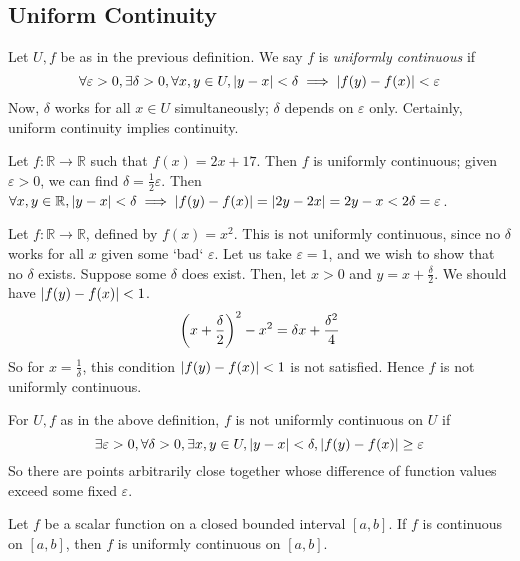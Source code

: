 \subsection{Uniform Continuity}
\begin{definition}
Let \( U, f \) be as in the previous definition.
We say \( f \) is \textit{uniformly continuous} if
\[ \forall \varepsilon > 0, \exists \delta > 0, \forall x, y \in U, \abs{y-x} < \delta \implies \abs{f(y) - f(x)} < \varepsilon \]
Now, \( \delta \) works for all \( x \in U \) simultaneously; \( \delta \) depends on \( \varepsilon \) only.
Certainly, uniform continuity implies continuity.
\end{definition}
\begin{example}
Let \( f \colon \mathbb R \to \mathbb R \) such that \( f(x) = 2x + 17 \).
Then \( f \) is uniformly continuous; given \( \varepsilon > 0 \), we can find \( \delta = \frac{1}{2} \varepsilon \).
Then \( \forall x, y \in \mathbb R, \abs{y-x} < \delta \implies \abs{f(y)-f(x)} = \abs{2y-2x} = 2{y-x} < 2 \delta = \varepsilon \).
\end{example}
\begin{example}
Let \( f \colon \mathbb R \to \mathbb R \), defined by \( f(x) = x^2 \).
This is not uniformly continuous, since no \( \delta \) works for all \( x \) given some `bad` \( \varepsilon \).
Let us take \( \varepsilon = 1 \), and we wish to show that no \( \delta \) exists.
Suppose some \( \delta \) does exist.
Then, let \( x > 0 \) and \( y = x + \frac{\delta}{2} \).
We should have \( \abs{f(y) - f(x)} < 1 \).
\[ \qty(x + \frac{\delta}{2})^2 - x^2 = \delta x + \frac{\delta^2}{4} \]
So for \( x = \frac{1}{\delta} \), this condition \( \abs{f(y) - f(x)} < 1 \) is not satisfied.
Hence \( f \) is not uniformly continuous.
\end{example}
\begin{note}
For \( U, f \) as in the above definition, \( f \) is not uniformly continuous on \( U \) if
\[ \exists \varepsilon > 0, \forall \delta > 0, \exists x, y \in U, \abs{y-x} < \delta, \abs{f(y) - f(x)} \geq \varepsilon \]
So there are points arbitrarily close together whose difference of function values exceed some fixed \( \varepsilon \).
\end{note}
\begin{theorem}
Let \( f \) be a scalar function on a closed bounded interval \( [a,b] \).
If \( f \) is continuous on \( [a,b] \), then \( f \) is uniformly continuous on \( [a,b] \).
\end{theorem}
